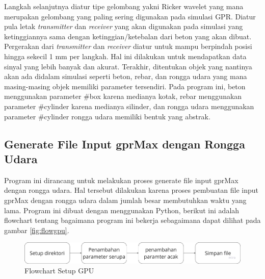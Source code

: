 Langkah selanjutnya diatur tipe gelombang yakni Ricker wavelet yang mana merupakan gelombang yang paling sering digunakan pada simulasi GPR. Diatur pula letak \emph{transmitter} dan \emph{receiver} yang akan digunakan pada simulasi yang ketinggiannya sama dengan ketinggian/ketebalan dari beton yang akan dibuat. Pergerakan dari \emph{transmitter} dan \emph{receiver} diatur untuk mampu berpindah posisi hingga sekecil 1 mm per langkah. Hal ini dilakukan untuk mendapatkan data sinyal yang lebih banyak dan akurat. Terakhir, ditentukan objek yang nantinya akan ada didalam simulasi seperti beton, rebar, dan rongga udara yang mana masing-masing objek memiliki parameter tersendiri. Pada program ini, beton menggunakan parameter \#box karena medianya kotak, rebar menggunakan parameter \#cylinder karena medianya silinder, dan rongga udara menggunakan parameter \#cylinder rongga udara memiliki bentuk yang abstrak.

\subsection{Generate File Input gprMax dengan Rongga Udara}
Program ini dirancang untuk melakukan proses generate file input gprMax dengan rongga udara. Hal tersebut dilakukan karena proses pembuatan file input gprMax dengan rongga udara dalam jumlah besar membutuhkan waktu yang lama. Program ini dibuat dengan menggunakan Python, berikut ini adalah flowchart tentang bagaimana program ini bekerja sebagaimana dapat dilihat pada gambar \ref{fig:flowgpu}.

\begin{figure} [H] \centering
  \includegraphics[scale=0.1]{gambar/bab3/flowmakein.png}
  \caption{Flowchart Setup GPU}
  \label{fig:flowmakein}
\end{figure}

